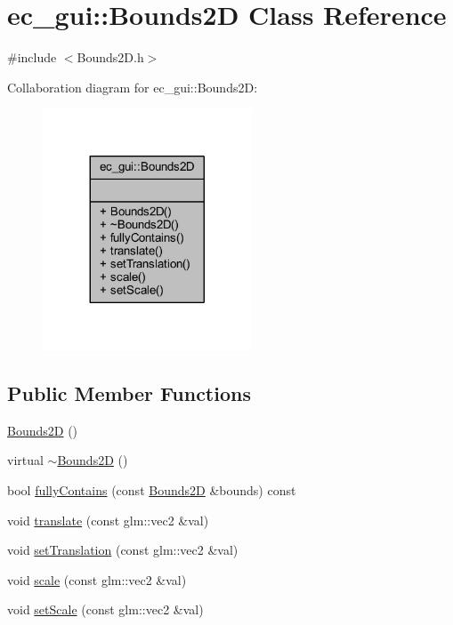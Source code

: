 \hypertarget{classec__gui_1_1_bounds2_d}{}\section{ec\+\_\+gui\+:\+:Bounds2D Class Reference}
\label{classec__gui_1_1_bounds2_d}


{\ttfamily \#include $<$Bounds2\+D.\+h$>$}



Collaboration diagram for ec\+\_\+gui\+:\+:Bounds2D\+:\nopagebreak
\begin{figure}[H]
\begin{center}
\leavevmode
\includegraphics[width=176pt]{classec__gui_1_1_bounds2_d__coll__graph}
\end{center}
\end{figure}
\subsection*{Public Member Functions}
\begin{DoxyCompactItemize}
\item 
\mbox{\hyperlink{classec__gui_1_1_bounds2_d_a329fcec6bf8d0c0756f9353e076842f7}{Bounds2D}} ()
\item 
virtual \mbox{\hyperlink{classec__gui_1_1_bounds2_d_aca393ee44d7311f8a735a09522af8072}{$\sim$\+Bounds2D}} ()
\item 
bool \mbox{\hyperlink{classec__gui_1_1_bounds2_d_adf9fb0f17e5751fca2fc20483d2af22b}{fully\+Contains}} (const \mbox{\hyperlink{classec__gui_1_1_bounds2_d}{Bounds2D}} \&bounds) const
\item 
void \mbox{\hyperlink{classec__gui_1_1_bounds2_d_a992c51ce6f5643dbd79b1b6f1d1ef36c}{translate}} (const glm\+::vec2 \&val)
\item 
void \mbox{\hyperlink{classec__gui_1_1_bounds2_d_a0fe0111873f372a13ba091e9ce1d7d58}{set\+Translation}} (const glm\+::vec2 \&val)
\item 
void \mbox{\hyperlink{classec__gui_1_1_bounds2_d_a604ee85f542957ac0895f56acd54cb54}{scale}} (const glm\+::vec2 \&val)
\item 
void \mbox{\hyperlink{classec__gui_1_1_bounds2_d_ad70c42347f6b24ddc3a8adc2d11e0a1d}{set\+Scale}} (const glm\+::vec2 \&val)
\end{DoxyCompactItemize}


